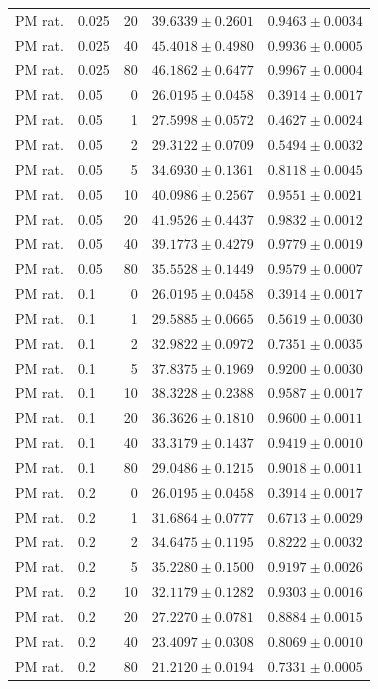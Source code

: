 \begin{longtable}{llrll}
PM rat. & 0.025 & 20 & $39.6339 \pm 0.2601$ & $0.9463 \pm 0.0034$ \\
PM rat. & 0.025 & 40 & $45.4018 \pm 0.4980$ & $0.9936 \pm 0.0005$ \\
PM rat. & 0.025 & 80 & $46.1862 \pm 0.6477$ & $0.9967 \pm 0.0004$ \\
PM rat. & 0.05 & 0 & $26.0195 \pm 0.0458$ & $0.3914 \pm 0.0017$ \\
PM rat. & 0.05 & 1 & $27.5998 \pm 0.0572$ & $0.4627 \pm 0.0024$ \\
PM rat. & 0.05 & 2 & $29.3122 \pm 0.0709$ & $0.5494 \pm 0.0032$ \\
PM rat. & 0.05 & 5 & $34.6930 \pm 0.1361$ & $0.8118 \pm 0.0045$ \\
PM rat. & 0.05 & 10 & $40.0986 \pm 0.2567$ & $0.9551 \pm 0.0021$ \\
PM rat. & 0.05 & 20 & $41.9526 \pm 0.4437$ & $0.9832 \pm 0.0012$ \\
PM rat. & 0.05 & 40 & $39.1773 \pm 0.4279$ & $0.9779 \pm 0.0019$ \\
PM rat. & 0.05 & 80 & $35.5528 \pm 0.1449$ & $0.9579 \pm 0.0007$ \\
PM rat. & 0.1 & 0 & $26.0195 \pm 0.0458$ & $0.3914 \pm 0.0017$ \\
PM rat. & 0.1 & 1 & $29.5885 \pm 0.0665$ & $0.5619 \pm 0.0030$ \\
PM rat. & 0.1 & 2 & $32.9822 \pm 0.0972$ & $0.7351 \pm 0.0035$ \\
PM rat. & 0.1 & 5 & $37.8375 \pm 0.1969$ & $0.9200 \pm 0.0030$ \\
PM rat. & 0.1 & 10 & $38.3228 \pm 0.2388$ & $0.9587 \pm 0.0017$ \\
PM rat. & 0.1 & 20 & $36.3626 \pm 0.1810$ & $0.9600 \pm 0.0011$ \\
PM rat. & 0.1 & 40 & $33.3179 \pm 0.1437$ & $0.9419 \pm 0.0010$ \\
PM rat. & 0.1 & 80 & $29.0486 \pm 0.1215$ & $0.9018 \pm 0.0011$ \\
PM rat. & 0.2 & 0 & $26.0195 \pm 0.0458$ & $0.3914 \pm 0.0017$ \\
PM rat. & 0.2 & 1 & $31.6864 \pm 0.0777$ & $0.6713 \pm 0.0029$ \\
PM rat. & 0.2 & 2 & $34.6475 \pm 0.1195$ & $0.8222 \pm 0.0032$ \\
PM rat. & 0.2 & 5 & $35.2280 \pm 0.1500$ & $0.9197 \pm 0.0026$ \\
PM rat. & 0.2 & 10 & $32.1179 \pm 0.1282$ & $0.9303 \pm 0.0016$ \\
PM rat. & 0.2 & 20 & $27.2270 \pm 0.0781$ & $0.8884 \pm 0.0015$ \\
PM rat. & 0.2 & 40 & $23.4097 \pm 0.0308$ & $0.8069 \pm 0.0010$ \\
PM rat. & 0.2 & 80 & $21.2120 \pm 0.0194$ & $0.7331 \pm 0.0005$ \\
\end{longtable}

